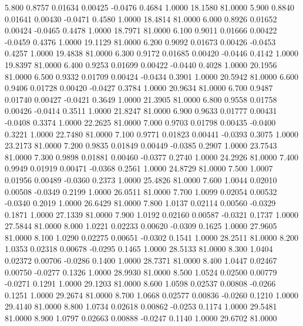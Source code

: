    5.800   0.8757   0.01634   0.00425  -0.0476   0.4684   1.0000  18.1580  81.0000
   5.900   0.8840   0.01641   0.00430  -0.0471   0.4580   1.0000  18.4814  81.0000
   6.000   0.8926   0.01652   0.00424  -0.0465   0.4478   1.0000  18.7971  81.0000
   6.100   0.9011   0.01666   0.00422  -0.0459   0.4376   1.0000  19.1129  81.0000
   6.200   0.9092   0.01673   0.00426  -0.0453   0.4257   1.0000  19.4838  81.0000
   6.300   0.9172   0.01685   0.00420  -0.0446   0.4142   1.0000  19.8397  81.0000
   6.400   0.9253   0.01699   0.00422  -0.0440   0.4028   1.0000  20.1956  81.0000
   6.500   0.9332   0.01709   0.00424  -0.0434   0.3901   1.0000  20.5942  81.0000
   6.600   0.9406   0.01728   0.00420  -0.0427   0.3784   1.0000  20.9634  81.0000
   6.700   0.9487   0.01740   0.00427  -0.0421   0.3649   1.0000  21.3905  81.0000
   6.800   0.9558   0.01758   0.00426  -0.0414   0.3511   1.0000  21.8247  81.0000
   6.900   0.9633   0.01777   0.00431  -0.0408   0.3374   1.0000  22.2625  81.0000
   7.000   0.9703   0.01798   0.00435  -0.0400   0.3221   1.0000  22.7480  81.0000
   7.100   0.9771   0.01823   0.00441  -0.0393   0.3075   1.0000  23.2173  81.0000
   7.200   0.9835   0.01849   0.00449  -0.0385   0.2907   1.0000  23.7543  81.0000
   7.300   0.9898   0.01881   0.00460  -0.0377   0.2740   1.0000  24.2926  81.0000
   7.400   0.9949   0.01919   0.00471  -0.0368   0.2561   1.0000  24.8729  81.0000
   7.500   1.0007   0.01956   0.00489  -0.0360   0.2373   1.0000  25.4826  81.0000
   7.600   1.0044   0.02010   0.00508  -0.0349   0.2199   1.0000  26.0511  81.0000
   7.700   1.0099   0.02054   0.00532  -0.0340   0.2019   1.0000  26.6429  81.0000
   7.800   1.0137   0.02114   0.00560  -0.0329   0.1871   1.0000  27.1339  81.0000
   7.900   1.0192   0.02160   0.00587  -0.0321   0.1737   1.0000  27.5844  81.0000
   8.000   1.0221   0.02233   0.00620  -0.0309   0.1625   1.0000  27.9605  81.0000
   8.100   1.0290   0.02275   0.00651  -0.0302   0.1541   1.0000  28.2511  81.0000
   8.200   1.0353   0.02318   0.00678  -0.0295   0.1465   1.0000  28.5133  81.0000
   8.300   1.0404   0.02372   0.00706  -0.0286   0.1400   1.0000  28.7371  81.0000
   8.400   1.0447   0.02467   0.00750  -0.0277   0.1326   1.0000  28.9930  81.0000
   8.500   1.0524   0.02500   0.00779  -0.0271   0.1291   1.0000  29.1203  81.0000
   8.600   1.0598   0.02537   0.00808  -0.0266   0.1251   1.0000  29.2674  81.0000
   8.700   1.0668   0.02577   0.00836  -0.0260   0.1210   1.0000  29.4140  81.0000
   8.800   1.0734   0.02618   0.00862  -0.0253   0.1174   1.0000  29.5481  81.0000
   8.900   1.0797   0.02663   0.00888  -0.0247   0.1140   1.0000  29.6702  81.0000
